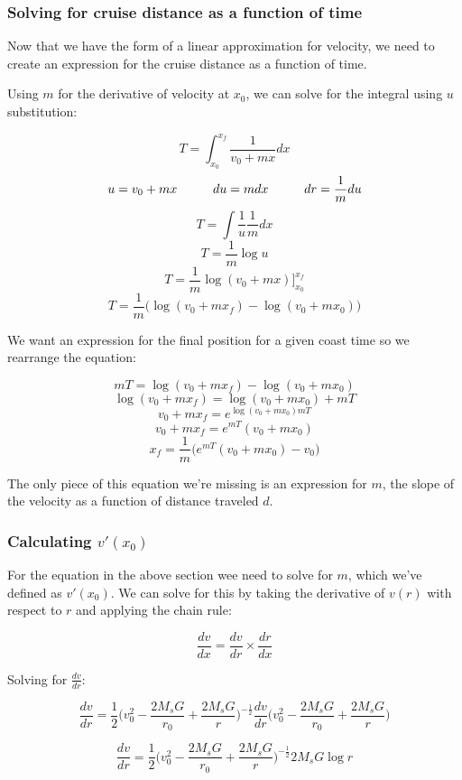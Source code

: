 \documentclass[12pt]{article} %
\begin{document}
\subsubsection{Solving for cruise distance as a function of time}

Now that we have the form of a linear approximation for velocity, we need to create an expression for the cruise distance as a function of time.

Using $m$ for the derivative of velocity at $x_0$, we can solve for the integral using $u$ substitution:

$$T = \int_{x_0}^{x_f} \frac{1}{v_0+mx} dx$$
$$u = v_0+mx\hspace{10mm}du = mdx\hspace{10mm}dr = \frac{1}{m}du$$
$$T = \int \frac{1}{u} \frac{1}{m}dx$$
$$T = \frac{1}{m} \log{u}$$
$$T = \frac{1}{m} \log{(v_0+mx)}\bigg]_{x_0}^{x_f}$$
$$T = \frac{1}{m} \bigg(\log{(v_0+mx_f)} - \log{(v_0+mx_0)}\bigg)$$

We want an expression for the final position for a given coast time so we rearrange the equation:

$$mT = \log{(v_0+mx_f)} - \log{(v_0+mx_0)}$$
$$\log{(v_0+mx_f)} = \log{(v_0+mx_0)} + mT$$
$$v_0 + mx_f = e^{\log{(v_0+mx_0)}{mT}}$$
$$v_0 + mx_f = e^{mT}(v_0+mx_0)$$
$$\boxed{x_f = \frac{1}{m}\bigg(e^{mT}(v_0+mx_0) - v_0\bigg)}$$


The only piece of this equation we're missing is an expression for $m$, the slope of the velocity as a function of distance traveled $d$. 

\subsubsection{Calculating $v'(x_0)$}

For the equation in the above section wee need to solve for $m$, which we've defined as $v'(x_0)$. We can solve for this by taking the derivative of $v(r)$ with respect to $r$ and applying the chain rule:

$$\frac{dv}{dx} = \frac{dv}{dr}\times\frac{dr}{dx}$$

Solving for $\frac{dv}{dr}$:

$$\frac{dv}{dr} = \frac{1}{2} \bigg(v_0^2-\frac{2M_sG}{r_0} + \frac{2M_sG}{r}\bigg)^{-\frac{1}{2}}\frac{dv}{dr}\bigg(v_0^2-\frac{2M_sG}{r_0} + \frac{2M_sG}{r}\bigg)$$

$$\frac{dv}{dr} = \frac{1}{2} \bigg(v_0^2-\frac{2M_sG}{r_0} + \frac{2M_sG}{r}\bigg)^{-\frac{1}{2}}2M_sG\log{r}$$
\end{document}
